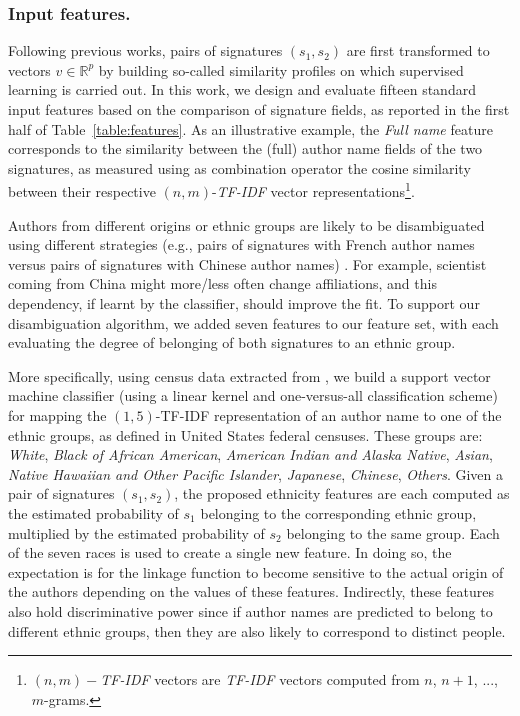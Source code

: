 \documentclass[runningheads,a4paper]{llncs}
\makeatletter
\newcommand*{\eg}{e.g.\@\xspace}
\newcommand{\longpage}{\enlargethispage{\baselineskip}}
\makeatother
\begin{document}

\subsubsection{Input features.} Following previous works, pairs of signatures $(s_1, s_2)$ are first transformed to vectors $v \in \mathbb{R}^p$
by building so-called similarity profiles \cite{treeratpituk2009disambiguating} on which supervised learning is carried out.
In this work, we design and evaluate fifteen standard input
features based on the comparison of signature fields, as reported in the first
half of Table~\ref{table:features}.
As an illustrative example, the \textit{Full name} feature corresponds to the similarity between the (full)
author name fields of the two signatures, as measured using as combination
operator the cosine similarity between their respective $(n,m)$-\emph{TF-IDF} vector
representations\footnote{$(n,m)-$\emph{TF-IDF} vectors are \emph{TF-IDF} vectors computed
from $n$, $n+1$, ..., $m$-grams.}.

Authors from different origins or ethnic groups are likely to be
disambiguated using different strategies (\eg, pairs of signatures with French
author names versus pairs of signatures with Chinese author names)
\cite{treeratpituk2012name, chin2014effective}. For example, scientist coming from China
might more/less often change affiliations, and this dependency, if learnt by the classifier, 
should improve the fit.
To support our disambiguation algorithm, we added seven features to our feature set, with each
evaluating the degree of belonging of both signatures to an ethnic group.

\longpage

More specifically, using census data extracted from \cite{rugglesintegrated},
we build a support vector machine classifier (using a linear kernel and
one-versus-all classification scheme) for mapping the
$(1,5)$-TF-IDF representation of an author name to one of the ethnic groups, as
defined in United States federal censuses. These groups are: \textit{White},
\textit{Black of African American}, \textit{American Indian and Alaska Native},
\textit{Asian}, \textit{Native Hawaiian and Other Pacific Islander},
\textit{Japanese}, \textit{Chinese}, \textit{Others}. Given a
pair of signatures $(s_1, s_2)$, the proposed ethnicity features are each
computed as the estimated probability of $s_1$ belonging to the corresponding
ethnic group, multiplied by the estimated probability of $s_2$ belonging to the
same group. Each of the seven races is used to create a single new feature.
In doing so, the expectation is for the linkage function to become
sensitive to the actual origin of the authors depending on the values of these
features. Indirectly, these features also hold discriminative
power since if author names are predicted to belong to different ethnic groups,
then they are also likely to correspond to distinct people.
\end{document}

